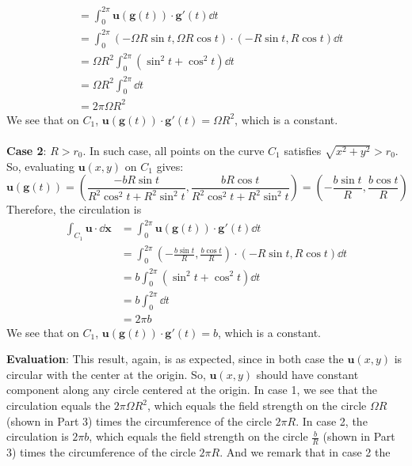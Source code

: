 \documentclass{article}
\begin{document}
\begin{enumerate}
\begin{enumerate}
\begin{enumerate}
\begin{align*}
      &= \int_{0}^{2\pi} \mathbf{u}(\mathbf{g}(t))\cdot \mathbf{g}'(t) \dd t\\
      &= \int_{0}^{2\pi} (-\Omega R\sin t, \Omega R\cos t) \cdot  (-R\sin t, R\cos t) \dd t\\
      &= \Omega R^2 \int_{0}^{2\pi} (\sin^2 t + \cos^2 t) \dd t\\
      &= \Omega R^2 \int_{0}^{2\pi} \dd t\\
      &= 2\pi \Omega R^2
    \end{align*}
    We see that on \(C_1\), \(\mathbf{u}(\mathbf{g}(t))\cdot \mathbf{g}'(t) = \Omega R^2\), which is a constant.\\
    \\
    \textbf{Case 2}: \(R> r_0\). In such case, all points on the curve \(C_1\) satisfies \(\sqrt{x^2+y^2}> r_0\).
    So, evaluating \(\mathbf{u}(x,y)\) on \(C_1\) gives:
    \begin{equation}
        \mathbf{u}(\mathbf{g}(t)) = \left(\frac{-bR\sin t}{R^2\cos^2 t + R^2\sin^2 t}, \frac{bR\cos t}{R^2\cos^2 t + R^2\sin^2 t} \right) = \left(-\frac{b\sin t}{R} , \frac{b\cos t}{R}\right)
    \end{equation}
    Therefore, the circulation is
    \begin{align*}
      \int_{C_1} \mathbf{u}\cdot \dd \mathbf{x}
      &= \int_{0}^{2\pi} \mathbf{u}(\mathbf{g}(t))\cdot \mathbf{g}'(t) \dd t\\
      &= \int_{0}^{2\pi} \left(-\frac{b\sin t}{R} , \frac{b\cos t}{R}\right) \cdot  (-R\sin t, R\cos t) \dd t\\
      &= b \int_{0}^{2\pi} (\sin^2 t + \cos^2 t) \dd t\\
      &= b \int_{0}^{2\pi} \dd t\\
      &= 2\pi b
    \end{align*}
    We see that on \(C_1\), \(\mathbf{u}(\mathbf{g}(t))\cdot \mathbf{g}'(t) = b\), which is a constant.\\
  \end{enumerate}
  \textbf{Evaluation}: This result, again, is as expected, since in both case the \(\mathbf{u}(x,y)\) is circular with
  the center at the origin. So, \(\mathbf{u}(x,y)\) should have constant component along any circle centered at the origin.
  In case 1, we see that the circulation equals the \(2\pi \Omega R^2\), which equals the field strength on the circle
  \(\Omega R\) (shown in Part 3) times the circumference of the circle \(2\pi R\). In case 2, the circulation is \(2\pi b\), which equals the
  field strength on the circle \(\frac{b}{R}\) (shown in Part 3) times the circumference of the circle \(2\pi R\). And we remark that in case 2 the

\end{enumerate}
\end{enumerate}
\end{document}
